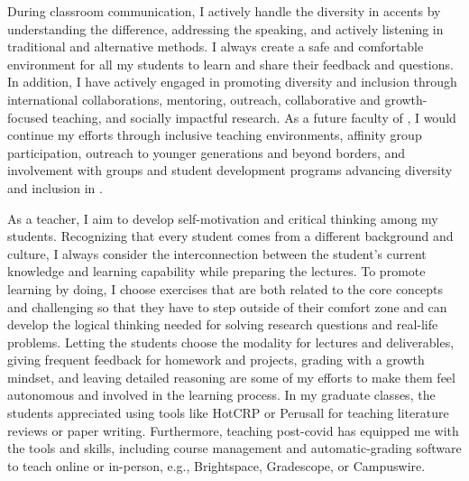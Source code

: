 \documentclass[10pt]{article}
\renewcommand*\paragraph[1]{}
\begin{document}
\paragraph{P4) The ability to contribute through teaching and/or service to the diversity, cultural sensitivity, and excellence of the academic community.}
\paragraph{Diversity}
During classroom communication, I actively handle the diversity in accents by understanding the difference, addressing the speaking, and actively listening in traditional and alternative methods.
I always create a safe and comfortable environment for all my students to learn and share their feedback and questions. In addition, I have actively engaged in promoting diversity and inclusion through international collaborations, mentoring, outreach, collaborative and growth-focused teaching, and socially impactful research. As a future faculty of \ifx\shortInstitutionName\undefined \InstitutionName \else \shortInstitutionName \fi, I would continue my efforts through inclusive teaching environments, affinity group participation, outreach to younger generations and beyond borders, and involvement with groups and student development programs advancing diversity and inclusion in \ifx\shortInstitutionName\undefined \InstitutionName \else \shortInstitutionName \fi.

%
As a teacher, I aim to develop self-motivation and critical thinking among my students. Recognizing that every student comes from a different background and culture, I always consider the interconnection between the student's current knowledge and learning capability while preparing the lectures. To promote learning by doing, I choose exercises that are both related to the core concepts and challenging so that they have to step outside of their comfort zone and can develop the logical thinking needed for solving research questions and real-life problems. Letting the students choose the modality for lectures and deliverables, giving frequent feedback for homework and projects, grading with a growth mindset, and leaving detailed reasoning are some of my efforts to make them feel autonomous and involved in the learning process. \ifx\degreeLevel\undefined \else In my graduate classes, the students appreciated using tools like HotCRP or Perusall for teaching literature reviews or paper writing. \fi
Furthermore, teaching post-covid has equipped me with the tools and skills, including course management and automatic-grading
software to teach online or in-person, e.g., Brightspace, Gradescope, or Campuswire.
\end{document}

